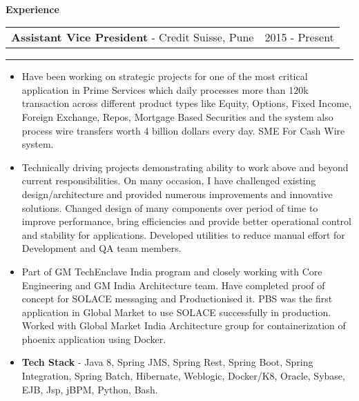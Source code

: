 \documentclass[10pt,A4]{article}
\newcommand{\cvsection}[1]
{
	\begin{center}
		\large\textcolor{sectcol}{\textbf{#1}}
	\end{center}
}
\newcommand{\cvevent}[4]
{

\begin{tabular*}{1\textwidth}{p{13.6cm}  x{3.9cm}}
	\textbf{#2} - \textcolor{bgcol}{#3} &   \vspace{2.0pt}\textcolor{sectcol}{#1}
\end{tabular*}

\vspace{-8pt}
\textcolor{softcol}{\hrule}
\vspace{6pt}

  #4 

}
\begin{document}
\ \\
%
%

\cvsection{Experience}

\cvevent{2015 - Present}
{Assistant Vice President}
{Credit Suisse, Pune}
{
\begin{itemize}

\item Have been working on strategic projects for one of the most critical application in Prime
Services which daily processes more than 120k transaction across different product types
like Equity, Options, Fixed Income, Foreign Exchange, Repos, Mortgage Based Securities 
and the system also process wire transfers worth 4 billion dollars every day. SME For Cash Wire system.	

\item Technically driving projects demonstrating ability to work above and beyond current
responsibilities. On many occasion, I have challenged existing design/architecture and provided
numerous improvements and innovative solutions. Changed design of many components
over period of time to improve performance, bring efficiencies and provide better operational
control and stability for applications. Developed utilities to reduce manual effort for
Development and QA team members.

\item Part of GM TechEnclave India program and closely working with Core Engineering and GM
India Architecture team. Have completed proof of concept for SOLACE messaging and Productionised it. 
PBS was the first application in Global Market to use SOLACE successfully in production. 
Worked with Global Market India Architecture group for containerization of phoenix application using
Docker.

\item \textbf{Tech Stack} - Java 8, Spring JMS, Spring Rest, Spring Boot, Spring Integration, Spring Batch, Hibernate, Weblogic, Docker/K8, Oracle, Sybase, EJB, Jsp, jBPM, Python, Bash.

\end{itemize}

}
\end{document}
